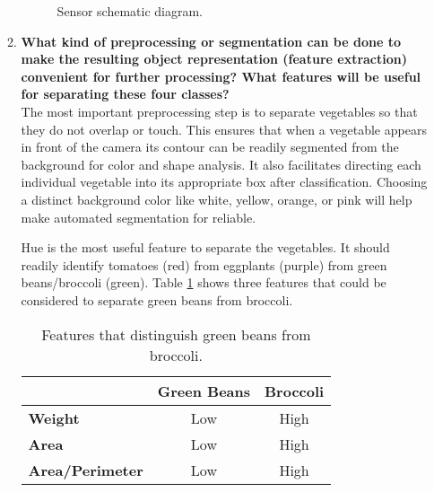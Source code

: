 \documentclass[12pt]{article}
\begin{document}
\begin{enumerate}
\begin{enumerate}
\begin{figure}[h]
    \caption{Sensor schematic diagram.}
    \end{figure}
  \item \textbf{What kind of preprocessing or segmentation can be done to make the resulting object representation (feature extraction) convenient for further processing?
    What features will be useful for separating these four classes?} \\
    The most important preprocessing step is to separate vegetables so that they do not overlap or touch.
    This ensures that when a vegetable appears in front of the camera its contour can be readily segmented from the background for color and shape analysis.
    It also facilitates directing each individual vegetable into its appropriate box after classification.
    Choosing a distinct background color like white, yellow, orange, or pink will help make automated segmentation for reliable.
    \par
    Hue is the most useful feature to separate the vegetables.
    It should readily identify tomatoes (red) from eggplants (purple) from green beans/broccoli (green).
    Table \ref{tbl:vegfeatures} shows three features that could be considered to separate green beans from broccoli.
    \begin{table}[h]
      \centering
      \begin{tabular}{l | c c}
        & \textbf{Green Beans} & \textbf{Broccoli} \\
        \hline
        \textbf{Weight} & Low & High \\
        \textbf{Area} & Low & High \\
        \textbf{Area/Perimeter} & Low & High \\
      \end{tabular}
      \caption{Features that distinguish green beans from broccoli.}
      \label{tbl:vegfeatures}
    \end{table}

\end{enumerate}
\end{enumerate}
\end{document}
